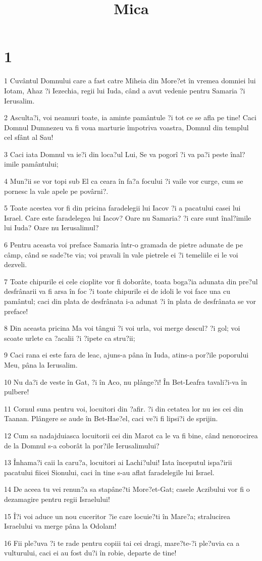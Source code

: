 

\title{Mica}


\chapter{1}

\par 1 Cuvântul Domnului care a fast catre Miheia din More?et în vremea domniei lui Iotam, Ahaz ?i Iezechia, regii lui Iuda, când a avut vedenie pentru Samaria ?i Ierusalim.
\par 2 Asculta?i, voi neamuri toate, ia aminte pamântule ?i tot ce se afla pe tine! Caci Domnul Dumnezeu va fi voua marturie împotriva voastra, Domnul din templul cel sfânt al Sau!
\par 3 Caci iata Domnul va ie?i din loca?ul Lui, Se va pogorî ?i va pa?i peste înal?imile pamântului;
\par 4 Mun?ii se vor topi sub El ca ceara în fa?a focului ?i vaile vor curge, cum se pornesc la vale apele pe povârni?.
\par 5 Toate acestea vor fi din pricina faradelegii lui Iacov ?i a pacatului casei lui Israel. Care este faradelegea lui Iacov? Oare nu Samaria? ?i care sunt înal?imile lui Iuda? Oare nu Ierusalimul?
\par 6 Pentru aceasta voi preface Samaria într-o gramada de pietre adunate de pe câmp, când se sade?te via; voi pravali în vale pietrele ei ?i temeliile ei le voi dezveli.
\par 7 Toate chipurile ei cele cioplite vor fi doborâte, toata boga?ia adunata din pre?ul desfrânarii va fi arsa în foc ?i toate chipurile ei de idoli le voi face una cu pamântul; caci din plata de desfrânata i-a adunat ?i în plata de desfrânata se vor preface!
\par 8 Din aceasta pricina Ma voi tângui ?i voi urla, voi merge descul? ?i gol; voi scoate urlete ca ?acalii ?i ?ipete ca stru?ii;
\par 9 Caci rana ei este fara de leac, ajuns-a pâna în Iuda, atins-a por?ile poporului Meu, pâna la Ierusalim.
\par 10 Nu da?i de veste în Gat, ?i în Aco, nu plânge?i! În Bet-Leafra tavali?i-va în pulbere!
\par 11 Cornul suna pentru voi, locuitori din ?afir. ?i din cetatea lor nu ies cei din Taanan. Plângere se aude în Bet-Hae?el, caci ve?i fi lipsi?i de sprijin.
\par 12 Cum sa nadajduiasca locuitorii cei din Marot ca le va fi bine, când nenorocirea de la Domnul s-a coborât la por?ile Ierusalimului?
\par 13 Înhama?i caii la caru?a, locuitori ai Lachi?ului! Iata începutul ispa?irii pacatului fiicei Sionului, caci în tine s-au aflat faradelegile lui Israel.
\par 14 De aceea tu vei renun?a sa stapâne?ti More?et-Gat; casele Aczibului vor fi o dezamagire pentru regii Israelului!
\par 15 Î?i voi aduce un nou cuceritor ?ie care locuie?ti în Mare?a; stralucirea Israelului va merge pâna la Odolam!
\par 16 Fii ple?uva ?i te rade pentru copiii tai cei dragi, mare?te-?i ple?uvia ca a vulturului, caci ei au fost du?i în robie, departe de tine!

